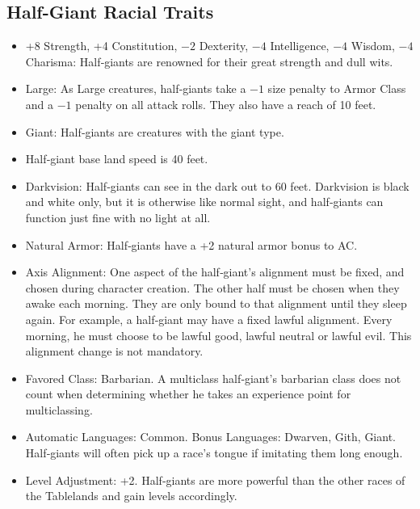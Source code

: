 \subsection{Half-Giant Racial Traits}
\begin{itemize}
    \item +8 Strength, +4 Constitution, $-2$ Dexterity, $-4$ Intelligence, $-4$ Wisdom, $-4$ Charisma: Half‐giants are renowned for their great strength and dull wits.
    \item Large: As Large creatures, half‐giants take a $-1$ size penalty to Armor Class and a $-1$ penalty on all attack rolls. They also have a reach of 10 feet.
    \item Giant: Half‐giants are creatures with the giant type.
    \item Half‐giant base land speed is 40 feet.
    \item Darkvision: Half‐giants can see in the dark out to 60 feet. Darkvision is black and white only, but it is otherwise like normal sight, and half‐giants can function just fine with no light at all.
    \item Natural Armor: Half‐giants have a +2 natural armor bonus to AC.
    \item Axis Alignment: One aspect of the half‐giant's alignment must be fixed, and chosen during character creation. The other half must be chosen when they awake each morning. They are only bound to that alignment until they sleep again. For example, a half‐giant may have a fixed lawful alignment. Every morning, he must choose to be lawful good, lawful neutral or lawful evil. This alignment change is not mandatory.
    \item Favored Class: Barbarian. A multiclass half‐giant's barbarian class does not count when determining whether he takes an experience point for multiclassing.
    \item Automatic Languages: Common. Bonus Languages: Dwarven, Gith, Giant. Half‐giants will often pick up a race's tongue if imitating them long enough.
    \item Level Adjustment: +2. Half‐giants are more powerful than the other races of the Tablelands and gain levels accordingly.
\end{itemize}